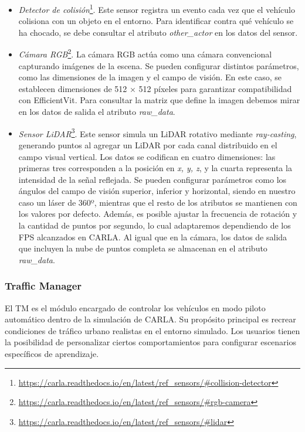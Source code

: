 \begin{itemize}
\item \textit{Detector de colisión}\footnote{\url{https://carla.readthedocs.io/en/latest/ref_sensors/\#collision-detector}}. Este sensor registra un evento cada vez que el vehículo colisiona con un objeto en el entorno. Para identificar contra qué vehículo se ha chocado, se debe consultar el atributo \textit{other\_actor} en los datos del sensor.

\item \textit{Cámara RGB}\footnote{\url{https://carla.readthedocs.io/en/latest/ref_sensors/\#rgb-camera}}. La cámara RGB actúa como una cámara convencional capturando imágenes de la escena. Se pueden configurar distintos parámetros, como las dimensiones de la imagen y el campo de visión. En este caso, se establecen dimensiones de 512 × 512 píxeles para garantizar compatibilidad con EfficientVit. Para consultar la matriz que define la imagen debemos mirar en los datos de salida el atributo \textit{raw\_data}.

\item \textit{Sensor \ac{LiDAR}}\footnote{\url{https://carla.readthedocs.io/en/latest/ref_sensors/\#lidar}}. Este sensor simula un \ac{LiDAR} rotativo mediante \textit{ray-casting}, generando puntos al agregar un \ac{LiDAR} por cada canal distribuido en el campo visual vertical. Los datos se codifican en cuatro dimensiones: las primeras tres corresponden a la posición en \textit{x, y, z}, y la cuarta representa la intensidad de la señal reflejada. Se pueden configurar parámetros como los ángulos del campo de visión superior, inferior y horizontal, siendo en nuestro caso un láser de 360º, mientras que el resto de los atributos se mantienen con los valores por defecto. Además, es posible ajustar la frecuencia de rotación y la cantidad de puntos por segundo, lo cual adaptaremos dependiendo de los \ac{FPS} alcanzados en CARLA. Al igual que en la cámara, los datos de salida que incluyen la nube de puntos completa se almacenan en el atributo \textit{raw\_data}.
\end{itemize}

\subsubsection{Traffic Manager}

El \ac{TM} es el módulo encargado de controlar los vehículos en modo piloto automático dentro de la simulación de CARLA. Su propósito principal es recrear condiciones de tráfico urbano realistas en el entorno simulado. Los usuarios tienen la posibilidad de personalizar ciertos comportamientos para configurar escenarios específicos de aprendizaje.

